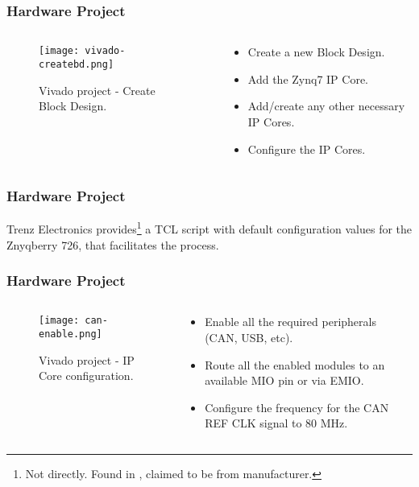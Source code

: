 \begin{frame}
	\frametitle{Hardware Project}
	\begin{columns}
		\begin{column}{0.5\textwidth}
			\begin{figure}
				\texttt{[image: vivado-createbd.png]}
				\caption{Vivado project - Create Block Design.}\label{fig:vivado-createbd}
			\end{figure}
		\end{column}
		\begin{column}{0.5\textwidth}
			\begin{itemize}
				\item Create a new Block Design.
				\item Add the Zynq7 IP Core.
				\item Add/create any other necessary IP Cores.
				\item Configure the IP Cores.
			\end{itemize}
		\end{column}
	\end{columns}
\end{frame}

\begin{frame}
	\frametitle{Hardware Project}
	Trenz Electronics provides\footnote[frame]{Not directly. Found in \cite{zynq-wiki}, claimed to be from manufacturer.} a TCL script with default configuration values for the Znyqberry 726, that facilitates the process.
	\vfill
	
\end{frame}

\begin{frame}
	\frametitle{Hardware Project}
	\begin{columns}
		\begin{column}{0.5\textwidth}
			\begin{figure}
				\texttt{[image: can-enable.png]}
				\caption{Vivado project - IP Core configuration.}\label{fig:can-enable}
			\end{figure}
		\end{column}
		\begin{column}{0.5\textwidth}
			\begin{itemize}
				\item Enable all the required peripherals (CAN, USB, etc).
				\item Route all the enabled modules to an available MIO pin or via EMIO.
				\item Configure the frequency for the CAN REF CLK signal to 80 MHz.
			\end{itemize}
		\end{column}
	\end{columns}
\end{frame}

